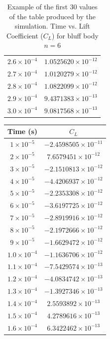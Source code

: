 \begin{table}[H]
\begin{tabular}{|c|c|}
		$2.6 \times 10^{-4}$ & $1.0525620 \times 10^{-12}$ \\
		$2.7 \times 10^{-4}$ & $1.0120279 \times 10^{-12}$ \\
		$2.8 \times 10^{-4}$ & $1.0822099 \times 10^{-12}$ \\
		$2.9 \times 10^{-4}$ & $9.4371383 \times 10^{-13}$ \\
		$3.0 \times 10^{-4}$ & $9.0817568 \times 10^{-13}$ \\
		\hline
	\end{tabular}
	\label{tab:6FaceClTable}
	\caption{Example of the first 30 values of the table produced by the simulation. Time vs. Lift Coefficient ($C_L$) for bluff body $n=6$}
\end{table}

\begin{table}[H]
	\centering
	\renewcommand{\arraystretch}{1.3}
	\begin{tabular}{|c|c|}
		\hline
		\textbf{Time (s)} & \textbf{$C_L$} \\
		\hline
		$1 \times 10^{-5}$  & $-2.4598505 \times 10^{-11}$ \\
		$2 \times 10^{-5}$  & $7.6579451 \times 10^{-12}$ \\
		$3 \times 10^{-5}$  & $-2.1510813 \times 10^{-12}$ \\
		$4 \times 10^{-5}$  & $-4.4206937 \times 10^{-12}$ \\
		$5 \times 10^{-5}$  & $-2.2353308 \times 10^{-12}$ \\
		$6 \times 10^{-5}$  & $-3.6197725 \times 10^{-12}$ \\
		$7 \times 10^{-5}$  & $-2.8919916 \times 10^{-12}$ \\
		$8 \times 10^{-5}$  & $-2.1972666 \times 10^{-12}$ \\
		$9 \times 10^{-5}$  & $-1.6629472 \times 10^{-12}$ \\
		$1.0 \times 10^{-4}$ & $-1.1636706 \times 10^{-12}$ \\
		$1.1 \times 10^{-4}$ & $-7.5429574 \times 10^{-13}$ \\
		$1.2 \times 10^{-4}$ & $-4.0834742 \times 10^{-13}$ \\
		$1.3 \times 10^{-4}$ & $-1.3927346 \times 10^{-13}$ \\
		$1.4 \times 10^{-4}$ & $2.5593892 \times 10^{-13}$ \\
		$1.5 \times 10^{-4}$ & $4.2789616 \times 10^{-13}$ \\
		$1.6 \times 10^{-4}$ & $6.3422462 \times 10^{-13}$ \\

\end{tabular}
\end{table}
